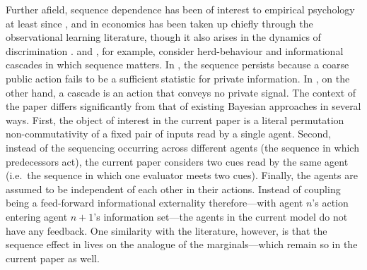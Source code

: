 \documentclass[a4paper,fleqn]{cas-sc}
\theoremstyle{remark}
\theoremstyle{definition}
\begin{document}
\par
Further afield, sequence dependence has been of interest to empirical psychology
at least since \citet{Asch1946}, and in economics has been taken up chiefly through
the observational learning literature, though it also arises in the dynamics of
discrimination \citep{Bohren2019}. \citet{BHW1992} and \citet{Banerjee1992}, for
example, consider herd-behaviour and informational cascades in which sequence matters. In
\citet{Banerjee1992}, the sequence persists because a coarse public action fails to be a
sufficient statistic for private information. In \citet{BHW1992}, on the other hand, a
cascade is an action that conveys no private signal. The context of the paper differs significantly
from that of existing Bayesian approaches in several ways. First, the object
of interest in the current paper is a literal permutation non-commutativity of a fixed
pair of inputs read by a single agent. Second, instead of the sequencing occurring across different agents (the sequence in
which predecessors act), the current paper considers two cues read by the same agent
(i.e.\ the sequence in which one evaluator meets two cues). Finally, the agents are assumed to be independent of each other in their actions. Instead of coupling being a feed-forward
informational externality therefore---with agent $n$'s action entering agent $n{+}1$'s information set---the agents in the current model do not have any feedback. One similarity with the literature, however,
is that the sequence effect in \citep{BHW1992, Banerjee1992} lives on the analogue of the
marginals---which remain so in the current paper as well.
\end{document}
